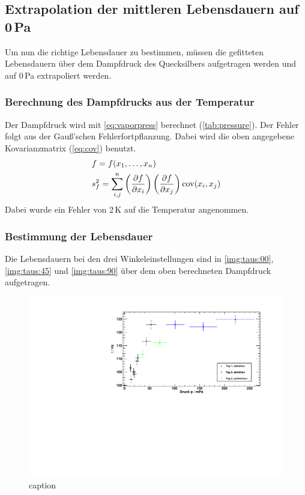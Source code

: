 \subsection{Extrapolation der mittleren Lebensdauern auf  \texorpdfstring{0\,Pa}{0 Pa}}
Um nun die richtige Lebensdauer zu bestimmen, müssen die gefitteten Lebensdauern über dem Dampfdruck des Quecksilbers aufgetragen werden und auf 
0\,Pa extrapoliert werden.
\subsubsection{Berechnung des Dampfdrucks aus der Temperatur}
Der Dampfdruck wird mit \autoref{eq:vaporpress} berechnet (\autoref{tab:pressure}). Der Fehler folgt aus der Gauß'schen Fehlerfortpflanzung.
Dabei wird die oben angegebene Kovarianzmatrix (\autoref{eq:cov}) benutzt.
\begin{equation}
\begin{split}
  & f = f(x_1, \ldots, x_n) \\
  & s_f^2 = \sum_{i, j}^n \left( \frac{\partial f}{\partial x_i} \right) \left( \frac{\partial f}{\partial x_j} \right) \operatorname{cov}(x_i, x_j)
\end{split}
\end{equation}
Dabei wurde ein Fehler von 2\,K auf die Temperatur angenommen.

\subsubsection{Bestimmung der Lebensdauer}
\label{subsub:fittaus}
Die Lebensdauern bei den drei Winkeleinstellungen sind in \autoref{img:taus:00}, \autoref{img:taus:45} und \autoref{img:taus:90} über 
dem oben berechneten Dampfdruck aufgetragen. 

\begin{figure}[H]
\begin{center}
  \includegraphics[width=\textwidth]{../img/taus_00.pdf}
  \caption{caption}
  \label{img:taus:00}
\end{center}
\end{figure}

